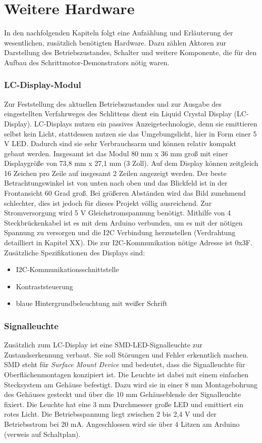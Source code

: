 
\chapter{Weitere Hardware}
In den nachfolgenden Kapiteln folgt eine Aufzählung und Erläuterung der wesentlichen, zusätzlich benötigten Hardware. Dazu zählen Aktoren zur Darstellung des Betriebszustandes, Schalter und weitere Komponente, die für den Aufbau des Schrittmotor-Demonstrators nötig waren.  

\subsection{LC-Display-Modul}
Zur Feststellung des aktuellen Betriebszustandes und zur Ausgabe des eingestellten Verfahrweges des Schlittens dient ein Liquid Crystal Display (LC-Display). LC-Displays nutzen ein passives Anzeigetechnologie, denn sie emittieren selbst kein Licht, stattdessen nutzen sie das Umgebungslicht, hier in Form einer 5 V LED. Dadurch sind sie sehr Verbrauchsarm und können relativ kompakt gebaut werden.\cite{HTech.2015} Insgesamt ist das Modul 80 mm x 36 mm groß mit einer Displaygröße von 73,8 mm x 27,1 mm (3 Zoll). Auf dem Display können zeitgleich 16 Zeichen pro Zeile auf insgesamt 2 Zeilen angezeigt werden. Der beste Betrachtungswinkel ist von unten nach oben und das Blickfeld ist in der Frontansicht 60 Grad groß. Bei größeren Abständen wird das Bild zunehmend schlechter, dies ist jedoch für dieses Projekt völlig ausreichend. Zur Stromversorgung wird 5 V Gleichstromspannung benötigt. Mithilfe von 4 Steckbrückenkabel ist es mit dem Arduino verbunden, um es mit der nötigen Spannung zu versorgen und die I2C Verbindung herzustellen (Verdrahtung detailliert in Kapitel XX). Die zur I2C-Kommunikation nötige Adresse ist 0x3F. %
Zusätzliche Spezifikationen des Displays sind: 
	\begin{itemize}
		\item I2C-Kommunikationsschnittstelle 
		\item Kontraststeuerung
		\item blaue Hintergrundbeleuchtung mit weißer Schrift
	\end{itemize}
\cite{WaveShare.2007}

\subsection{Signalleuchte}
Zusätzlich zum LC-Display ist eine SMD-LED-Signalleuchte zur Zustandserkennung verbaut. Sie soll Störungen und Fehler erkenntlich machen. SMD steht für \emph{Surface Mount Device} und bedeutet, dass die Signalleuchte für Oberflächenmontagen konzipiert ist. Die Leuchte ist dabei mit einem einfachen Stecksystem am Gehäuse befestigt. Dazu wird sie in einer 8 mm Montagebohrung des Gehäuses gesteckt und über die 10 mm Gehäuseblende der Signalleuchte fixiert. Die Leuchte hat eine 3 mm Durchmesser große LED und emittiert ein rotes Licht. Die Betriebsspannung liegt zwischen 2 bis 2,4 V und der Betriebsstrom bei 20 mA. Angeschlossen wird sie über 4 Litzen am Arduino (verweis auf Schaltplan).\cite{Mentor.2024}


